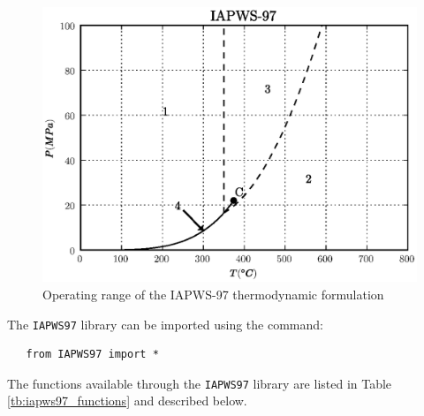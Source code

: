 \begin {figure}
  \begin{center}
    \includegraphics{ptplot.eps}
    \caption{Operating range of the IAPWS-97 thermodynamic formulation}
    \label{fg:iapws97_range}
  \end{center}
\end {figure}

The \texttt{IAPWS97} library can be imported using the command:

\begin{lstlisting} 
   from IAPWS97 import *
\end{lstlisting}

The functions available through the \texttt{IAPWS97} library are listed in Table \ref{tb:iapws97_functions} and described below.

